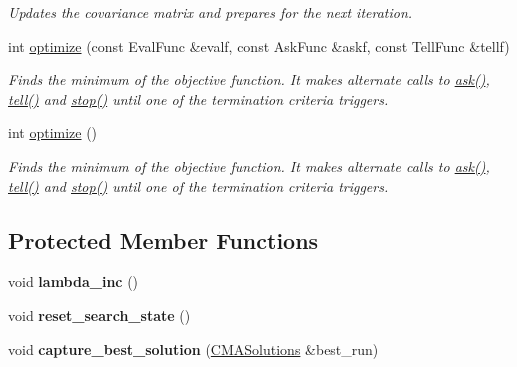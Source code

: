 \begin{DoxyCompactItemize}
\begin{DoxyCompactList}\small\item\em Updates the covariance matrix and prepares for the next iteration. \end{DoxyCompactList}\item 
int \hyperlink{classlibcmaes_1_1IPOPCMAStrategy_a50555839c736d8189704d5d6d8e87553}{optimize} (const Eval\-Func \&evalf, const Ask\-Func \&askf, const Tell\-Func \&tellf)
\begin{DoxyCompactList}\small\item\em Finds the minimum of the objective function. It makes alternate calls to \hyperlink{classlibcmaes_1_1CMAStrategy_ab7266bc50732458ffcab690bc26380e6}{ask()}, \hyperlink{classlibcmaes_1_1IPOPCMAStrategy_a9b3b59e7caf752f48b37500d84736137}{tell()} and \hyperlink{classlibcmaes_1_1CMAStrategy_adc87b9c500959c800b6bc93d89432ecc}{stop()} until one of the termination criteria triggers. \end{DoxyCompactList}\item 
int \hyperlink{classlibcmaes_1_1IPOPCMAStrategy_a9c4f8ae0a8cbf600ba8fe7270e63172a}{optimize} ()
\begin{DoxyCompactList}\small\item\em Finds the minimum of the objective function. It makes alternate calls to \hyperlink{classlibcmaes_1_1CMAStrategy_ab7266bc50732458ffcab690bc26380e6}{ask()}, \hyperlink{classlibcmaes_1_1IPOPCMAStrategy_a9b3b59e7caf752f48b37500d84736137}{tell()} and \hyperlink{classlibcmaes_1_1CMAStrategy_adc87b9c500959c800b6bc93d89432ecc}{stop()} until one of the termination criteria triggers. \end{DoxyCompactList}\end{DoxyCompactItemize}
\subsection*{Protected Member Functions}
\begin{DoxyCompactItemize}
\item 
\hypertarget{classlibcmaes_1_1IPOPCMAStrategy_a210bde295a32c8da7906729831fcf5e2}{void {\bfseries lambda\-\_\-inc} ()}\label{classlibcmaes_1_1IPOPCMAStrategy_a210bde295a32c8da7906729831fcf5e2}

\item 
\hypertarget{classlibcmaes_1_1IPOPCMAStrategy_a8de562ec27e295c3b2517b1669fef0be}{void {\bfseries reset\-\_\-search\-\_\-state} ()}\label{classlibcmaes_1_1IPOPCMAStrategy_a8de562ec27e295c3b2517b1669fef0be}

\item 
\hypertarget{classlibcmaes_1_1IPOPCMAStrategy_a2f4d09dc1a86de8e4a1116cce4e518e8}{void {\bfseries capture\-\_\-best\-\_\-solution} (\hyperlink{classlibcmaes_1_1CMASolutions}{C\-M\-A\-Solutions} \&best\-\_\-run)}\label{classlibcmaes_1_1IPOPCMAStrategy_a2f4d09dc1a86de8e4a1116cce4e518e8}

\end{DoxyCompactItemize}
